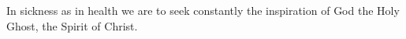 In sickness as in health we are to seek constantly the inspiration of God the Holy Ghost, the Spirit of Christ.



